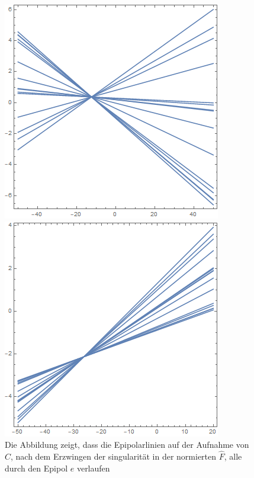 

\begin{figure}[!htb]
	\includegraphics[width=\linewidth]{images/L_PC1_F_Constraint.png}
	\caption[Epipolarlinien in $C$ aus singulärer Fundamentalmatrix]{Die Abbildung zeigt, dass die Epipolarlinien auf der Aufnahme von $C$, nach dem Erzwingen der singularität in der normierten $\hat{F}$, alle durch den Epipol $e$ verlaufen}
	\label{fig:EpipoleWithF1}
	\endminipage\hfill
	\includegraphics[width=\linewidth]{images/LPrime_PC2_F_Constraint.png}

\end{figure}
